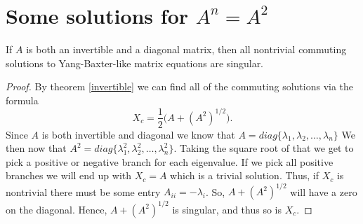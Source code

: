 \documentclass{article}
\begin{document}
\section{Some solutions for $A^n = A^2$}
\begin{theorem} \label{singular}
  If $A$ is both an invertible and a diagonal matrix, then all nontrivial commuting solutions to Yang-Baxter-like matrix equations are singular.
\end{theorem}

\begin{proof}
  By theorem \ref{invertible} we can find all of the commuting solutions via the formula
  \[X_c = \frac{1}{2} \bigl( A + (A^2)^{1/2} \bigl).\]
  Since $A$ is both invertible and diagonal we know that $A = diag\{\lambda_1, \lambda_2, \ldots, \lambda_n\}$
  We then now that $A^2 = diag\{\lambda_1^2, \lambda_2^2, \ldots, \lambda_n^2\}$.
  Taking the square root of that we get to pick a positive or negative branch for each eigenvalue.
  If we pick all positive branches we will end up with $X_c = A$ which is a trivial solution.
  Thus, if $X_c$ is nontrivial there must be some entry $A_{ii} = - \lambda_i$.
  So, $A + (A^2)^{1/2}$ will have a zero on the diagonal.
  Hence, $A + (A^2)^{1/2}$ is singular, and thus so is $X_c$.
\end{proof}
\end{document}
